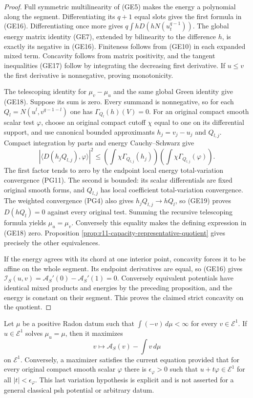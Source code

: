 \begin{proof}
Full symmetric multilinearity of (GE5) makes the energy a
polynomial along the segment. Differentiating its $q+1$
equal slots gives the first formula in (GE16). Differentiating
once more gives
$q\int hD(hN(u_t^{q-1}))$. The global energy matrix identity
(GE7), extended by bilinearity to the difference $h$, is
exactly its negative in (GE16). Finiteness follows from
(GE10) in each expanded mixed term. Concavity follows from
matrix positivity, and the tangent inequalities (GE17) follow
by integrating the decreasing first derivative. If $u\leq v$
the first derivative is nonnegative, proving monotonicity.

The telescoping identity for $\mu_v-\mu_u$ and the same
global Green identity give (GE18). Suppose its sum is zero.
Every summand is nonnegative, so for each
$Q_l=N(u^l,v^{q-1-l})$ one has
$\Gamma_{Q_l}(h)(V)=0$.
For an original compact smooth scalar test $\varphi$, choose
an original compact cutoff $\chi$ equal to one on its
differential support, and use canonical bounded approximants
$h_j=v_j-u_j$ and $Q_{l,j}$. Compact integration by parts
and energy Cauchy--Schwarz give
\[
 |\langle D(h_jQ_{l,j}),\varphi\rangle|^2
       \leq\left(\int\chi\Gamma_{Q_{l,j}}(h_j)\right)
             \left(\int\chi\Gamma_{Q_{l,j}}(\varphi)\right).
 \tag{GE19}
\]
The first factor tends to zero by the endpoint local
energy total-variation convergence (PG11). The second is
bounded: its scalar differentials are fixed original smooth
forms, and $Q_{l,j}$ has local coefficient total-variation
convergence. The weighted convergence (PG4) also gives
$h_jQ_{l,j}\to hQ_l$, so (GE19) proves $D(hQ_l)=0$
against every original test. Summing the recursive telescoping
formula yields $\mu_u=\mu_v$. Conversely this equality
makes the defining expression in (GE18) zero. Proposition
\ref{prop:r11-capacity-representative-quotient} gives precisely
the other equivalences.

If the energy agrees with its chord at one interior point,
concavity forces it to be affine on the whole segment.
Its endpoint derivatives are equal, so (GE16) gives
$\mathscr I_S(u,v)=\mathscr A_S'(0)-\mathscr A_S'(1)=0$.
Conversely equivalent potentials have identical mixed products
and energies by the preceding proposition, and the energy is
constant on their segment. This proves the claimed strict
concavity on the quotient.
\end{proof}

\begin{corollary}
\label{cor:r11-variational-necessary-condition}
Let $\mu$ be a positive Radon datum such that
$\int(-v)\,d\mu<\infty$ for every $v\in\mathcal E^1$.
If $u\in\mathcal E^1$ solves $\mu_u=\mu$, then it maximizes
\[
                   v\longmapsto\mathscr A_S(v)-\int v\,d\mu
 \tag{GE20}
\]
on $\mathcal E^1$. Conversely, a maximizer satisfies the
current equation provided that for every original compact
smooth scalar $\varphi$ there is $\epsilon_\varphi>0$
such that $u+t\varphi\in\mathcal E^1$ for all
$|t|<\epsilon_\varphi$. This last variation hypothesis is
explicit and is not asserted for a general classical psh
potential or arbitrary datum.
\end{corollary}

